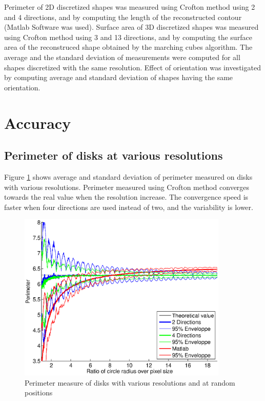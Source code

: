 \documentclass{InsightArticle}
\begin{document}
Perimeter of 2D discretized shapes was measured using Crofton method using 2 and 4 directions, 
and by computing the length of the reconstructed contour (Matlab Software was used).
Surface area of 3D discretized shapes was measured using Crofton method using 3 and 13 directions, 
and by computing the surface area of the reconstruced shape obtained by the marching cubes algorithm.
The average and the standard deviation of measurements were computed for all shapes discretized
with the same resolution. Effect of orientation was investigated by computing average and standard 
deviation of shapes having the same orientation.


\section{Accuracy}

\subsection{Perimeter of disks at various resolutions}

Figure \ref{fig:MeasureDiskPerimeter} shows average and standard deviation of perimeter
measured on disks with various resolutions. Perimeter measured using Crofton method converges
towards the real value when the resolution increase. 
The convergence speed is faster when four directions are used instead of two, 
and the variability is lower.

\begin{figure}[!htb]
\begin{center}
\includegraphics[width=10cm]{images/perimeterDisks}
\end{center}
\caption{Perimeter measure of disks with various resolutions and at random positions}
\label{fig:MeasureDiskPerimeter}
\end{figure}
\end{document}
